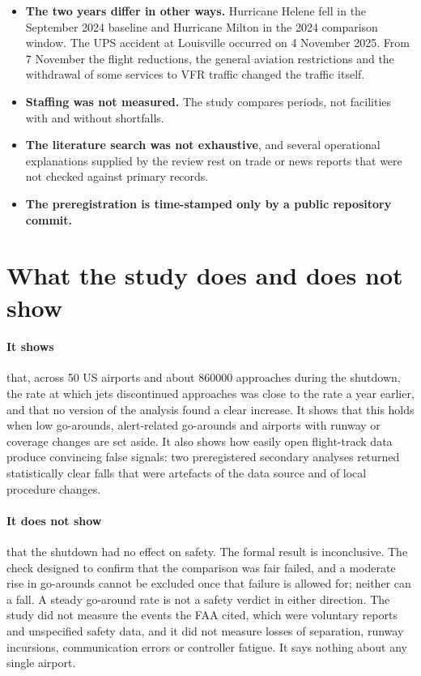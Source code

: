 \documentclass[11pt]{article}
\begin{document}
\begin{itemize}
\item \textbf{The two years differ in other ways.} Hurricane Helene fell in the September 2024 baseline and Hurricane Milton in the 2024 comparison window. The UPS accident at Louisville occurred on 4 November 2025. From 7 November the flight reductions, the general aviation restrictions and the withdrawal of some services to VFR traffic changed the traffic itself.
\item \textbf{Staffing was not measured.} The study compares periods, not facilities with and without shortfalls.
\item \textbf{The literature search was not exhaustive}, and several operational explanations supplied by the review rest on trade or news reports that were not checked against primary records.
\item \textbf{The preregistration is time-stamped only by a public repository commit.}
\end{itemize}

\section{What the study does and does not show}\label{sec:closing}

\paragraph{It shows} that, across 50 US airports and about \num{860000} approaches during the shutdown, the rate at which jets discontinued approaches was close to the rate a year earlier, and that no version of the analysis found a clear increase. It shows that this holds when low go-arounds, alert-related go-arounds and airports with runway or coverage changes are set aside. It also shows how easily open flight-track data produce convincing false signals: two preregistered secondary analyses returned statistically clear falls that were artefacts of the data source and of local procedure changes.

\paragraph{It does not show} that the shutdown had no effect on safety. The formal result is inconclusive. The check designed to confirm that the comparison was fair failed, and a moderate rise in go-arounds cannot be excluded once that failure is allowed for; neither can a fall. A steady go-around rate is not a safety verdict in either direction. The study did not measure the events the FAA cited, which were voluntary reports and unspecified safety data, and it did not measure losses of separation, runway incursions, communication errors or controller fatigue. It says nothing about any single airport.
\end{document}
